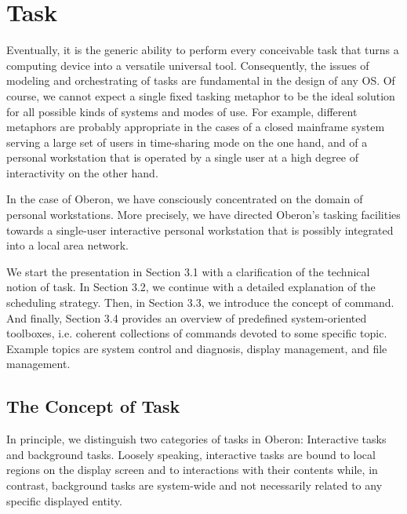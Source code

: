 \chapter{Task}
\label{ch:task}
Eventually, it is the generic ability to perform every conceivable task that turns a computing device
into a versatile universal tool. Consequently, the issues of modeling and orchestrating of tasks are
fundamental in the design of any OS. Of course, we cannot expect a single fixed
tasking metaphor to be the ideal solution for all possible kinds of systems and modes of use. For
example, different metaphors are probably appropriate in the cases of a closed mainframe system
serving a large set of users in time-sharing mode on the one hand, and of a personal workstation
that is operated by a single user at a high degree of interactivity on the other hand.

In the case of Oberon, we have consciously concentrated on the domain of personal
workstations. More precisely, we have directed Oberon's tasking facilities towards a single-user
interactive personal workstation that is possibly integrated into a local area network.

We start the presentation in Section 3.1 with a clarification of the technical notion of task. In
Section 3.2, we continue with a detailed explanation of the scheduling strategy. Then, in Section
3.3, we introduce the concept of command. And finally, Section 3.4 provides an overview of
predefined system-oriented toolboxes, i.e. coherent collections of commands devoted to some
specific topic. Example topics are system control and diagnosis, display management, and file management.

\section{The Concept of Task}
In principle, we distinguish two categories of tasks in Oberon: Interactive tasks and background
tasks. Loosely speaking, interactive tasks are bound to local regions on the display screen and to
interactions with their contents while, in contrast, background tasks are system-wide and not
necessarily related to any specific displayed entity.

